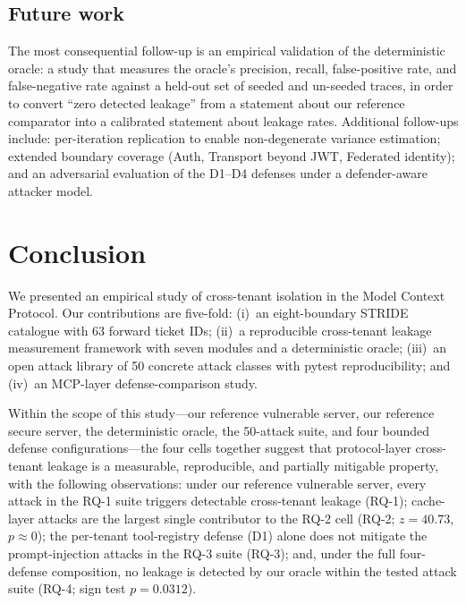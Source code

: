 \documentclass[sigconf, anonymous, natbib=false]{acmart}
\begin{document}
\subsection{Future work}

The most consequential follow-up is an empirical validation
of the deterministic oracle: a study that measures the
oracle's precision, recall, false-positive rate, and
false-negative rate against a held-out set of seeded and
un-seeded traces, in order to convert ``zero detected
leakage'' from a statement about our reference comparator
into a calibrated statement about leakage rates. Additional
follow-ups include: per-iteration replication to enable
non-degenerate variance estimation; extended boundary
coverage (Auth, Transport beyond JWT, Federated identity);
and an adversarial evaluation of the D1--D4 defenses under
a defender-aware attacker model.

\section{Conclusion}\label{sec:conclusion}

We presented an empirical study of cross-tenant isolation
in the Model Context Protocol. Our contributions are
five-fold: (i)~an eight-boundary STRIDE catalogue with
63 forward ticket IDs; (ii)~a reproducible cross-tenant
leakage measurement framework with seven modules and a
deterministic oracle; (iii)~an open attack library of 50
concrete attack classes with pytest reproducibility; and
(iv)~an MCP-layer defense-comparison study.

Within the scope of this study---our reference vulnerable
server, our reference secure server, the deterministic
oracle, the 50-attack suite, and four bounded defense
configurations---the four cells together suggest that
protocol-layer cross-tenant leakage is a measurable,
reproducible, and partially mitigable property, with the
following observations: under our reference vulnerable
server, every attack in the RQ-1 suite triggers detectable
cross-tenant leakage (RQ-1); cache-layer attacks are the
largest single contributor to the RQ-2 cell (RQ-2;
$z = 40.73$, $p \approx 0$); the per-tenant tool-registry
defense (D1) alone does not mitigate the prompt-injection
attacks in the RQ-3 suite (RQ-3); and, under the full
four-defense composition, no leakage is detected by our
oracle within the tested attack suite (RQ-4; sign test
$p = 0.0312$).
\end{document}
